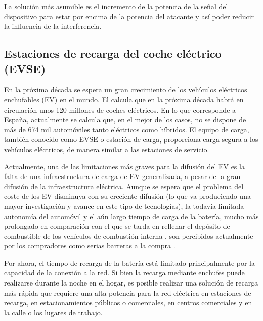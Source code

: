 \documentclass[12pt,a4paper,onecolumn,oneside]{report}
\begin{document}
\begin{enumerate}
\begin{enumerate}
La solución más asumible es el incremento de la potencia de la señal del dispositivo para estar por encima de la potencia del atacante y así poder reducir la influencia de la interferencia.



\end{enumerate}


\end{enumerate}




\subsection{Estaciones de recarga del coche eléctrico (EVSE)}
\label{Estaciones de recarga del coche eléctrico (EVSE)}

En la próxima década se espera un gran crecimiento de los vehículos eléctricos enchufables (EV) en el mundo. El calcula que en la próxima década habrá en circulación unos 120 millones de coches eléctricos. En lo que corresponde a España, actualmente se calcula que, en el mejor de los casos, no se dispone de más de 674 mil automóviles tanto eléctricos como híbridos. El equipo de carga, también conocido como EVSE o estación de carga, proporciona carga segura a los vehículos eléctricos, de manera similar a las estaciones de servicio. 

Actualmente, una de las limitaciones más graves para la difusión del EV es la falta de una infraestructura de carga de EV generalizada, a pesar de la gran difusión de la infraestructura eléctrica. Aunque se espera que el problema del coste de los EV disminuya con su creciente difusión (lo que va produciendo una mayor investigación y avance en este tipo de tecnologías), la todavía limitada autonomía del automóvil y el aún largo tiempo de carga de la batería, mucho más prolongado en comparación con el que se tarda en rellenar el depósito de combustible de los vehículos de combustión interna \cite{diezuno}, son percibidos actualmente por los compradores como serias barreras a la compra \cite{diezdos}\cite{dieztres}.

Por ahora, el tiempo de recarga de la batería está limitado principalmente por la capacidad de la conexión a la red. Si bien la recarga mediante enchufes puede realizarse durante la noche en el hogar, es posible realizar una solución de recarga más rápida que requiere una alta potencia para la red eléctrica en estaciones de recarga, en estacionamientos públicos o comerciales, en centros comerciales y en la calle o los lugares de trabajo.
\end{document}
